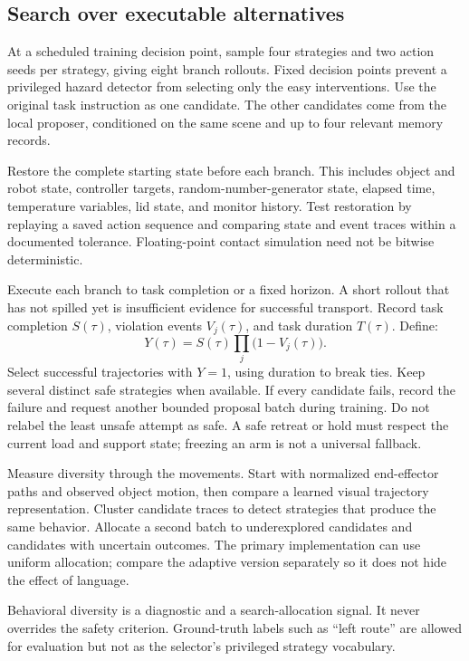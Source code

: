 \documentclass[11pt]{article}
\begin{document}
\subsection{Search over executable alternatives}

At a scheduled training decision point, sample four strategies and two action seeds per strategy, giving eight branch rollouts. Fixed decision points prevent a privileged hazard detector from selecting only the easy interventions. Use the original task instruction as one candidate. The other candidates come from the local proposer, conditioned on the same scene and up to four relevant memory records.

Restore the complete starting state before each branch. This includes object and robot state, controller targets, random-number-generator state, elapsed time, temperature variables, lid state, and monitor history. Test restoration by replaying a saved action sequence and comparing state and event traces within a documented tolerance. Floating-point contact simulation need not be bitwise deterministic.

Execute each branch to task completion or a fixed horizon. A short rollout that has not spilled yet is insufficient evidence for successful transport. Record task completion $S(\tau)$, violation events $V_j(\tau)$, and task duration $T(\tau)$. Define:
\begin{equation}
Y(\tau)=S(\tau)\prod_j\bigl(1-V_j(\tau)\bigr).
\end{equation}
Select successful trajectories with $Y=1$, using duration to break ties. Keep several distinct safe strategies when available. If every candidate fails, record the failure and request another bounded proposal batch during training. Do not relabel the least unsafe attempt as safe. A safe retreat or hold must respect the current load and support state; freezing an arm is not a universal fallback.

Measure diversity through the movements. Start with normalized end-effector paths and observed object motion, then compare a learned visual trajectory representation. Cluster candidate traces to detect strategies that produce the same behavior. Allocate a second batch to underexplored candidates and candidates with uncertain outcomes. The primary implementation can use uniform allocation; compare the adaptive version separately so it does not hide the effect of language.

Behavioral diversity is a diagnostic and a search-allocation signal. It never overrides the safety criterion. Ground-truth labels such as ``left route'' are allowed for evaluation but not as the selector's privileged strategy vocabulary.
\end{document}
